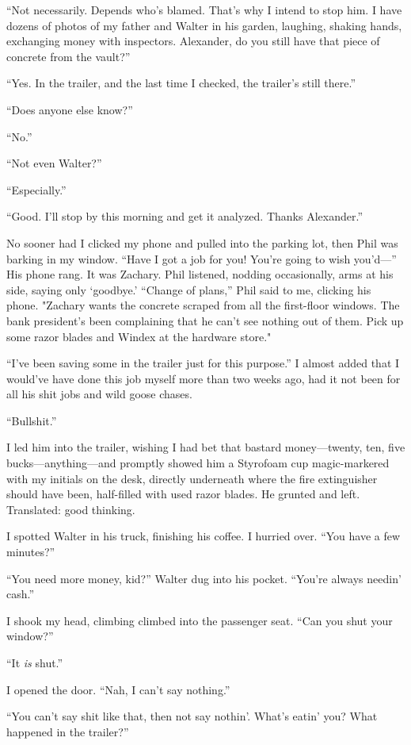 ``Not necessarily. Depends who's blamed. That's why I intend to stop
him. I have dozens of photos of my father and Walter in his garden,
laughing, shaking hands, exchanging money with inspectors. Alexander, do
you still have that piece of concrete from the vault?''

``Yes. In the trailer, and the last time I checked, the trailer's still
there.''

``Does anyone else know?''

``No.''

``Not even Walter?''

``Especially.''

``Good. I'll stop by this morning and get it analyzed. Thanks
Alexander.''

No sooner had I clicked my phone and pulled into the parking lot, then
Phil was barking in my window. ``Have I got a job for you! You're going
to wish you'd---'' His phone rang. It was Zachary. Phil listened,
nodding occasionally, arms at his side, saying only `goodbye.' ``Change
of plans,'' Phil said to me, clicking his phone. "Zachary wants the
concrete scraped from all the first-floor windows. The bank president's
been complaining that he can't see nothing out of them. Pick up some
razor blades and Windex at the hardware store."

``I've been saving some in the trailer just for this purpose.'' I almost
added that I would've have done this job myself more than two weeks ago,
had it not been for all his shit jobs and wild goose chases.

``Bullshit.''

I led him into the trailer, wishing I had bet that bastard
money---twenty, ten, five bucks---anything---and promptly showed him a
Styrofoam cup magic-markered with my initials on the desk, directly
underneath where the fire extinguisher should have been, half-filled
with used razor blades. He grunted and left. Translated: good thinking.

I spotted Walter in his truck, finishing his coffee. I hurried over.
``You have a few minutes?''

``You need more money, kid?'' Walter dug into his pocket. ``You're
always needin' cash.''

I shook my head, climbing climbed into the passenger seat. ``Can you
shut your window?''

``It \emph{is} shut.''

I opened the door. ``Nah, I can't say nothing.''

``You can't say shit like that, then not say nothin'. What's eatin' you?
What happened in the trailer?''

